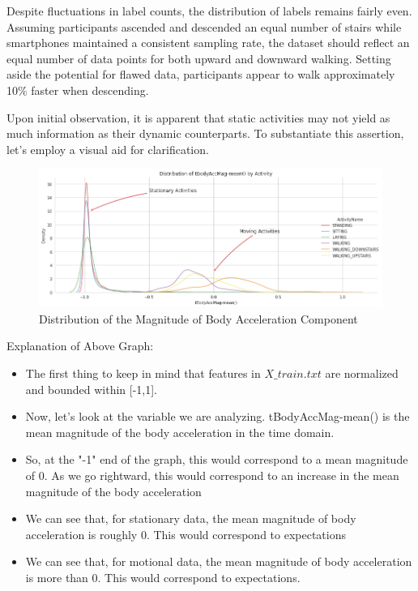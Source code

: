 \documentclass[conference]{IEEEtran}
\begin{document}
Despite fluctuations in label counts, the distribution of labels remains fairly even. Assuming participants ascended and descended an equal number of stairs while smartphones maintained a consistent sampling rate, the dataset should reflect an equal number of data points for both upward and downward walking. Setting aside the potential for flawed data, participants appear to walk approximately 10\% faster when descending. \newline 


Upon initial observation, it is apparent that static activities may not yield as much information as their dynamic counterparts. To substantiate this assertion, let's employ a visual aid for clarification. \newline 

\begin{figure}[h!]
	\includegraphics[width= 1.0 \linewidth]{distribution_acc_activity.png}
	\centering
	\caption{Distribution of the Magnitude of Body Acceleration Component}
	\label{distribution_acc_activity.png}
\end{figure}

Explanation of Above Graph: \newline 
\begin{itemize}
    \item The first thing to keep in mind that features in $X\_train.txt$ are normalized and bounded within [-1,1].
    \item Now, let's look at the variable we are analyzing. tBodyAccMag-mean() is the mean magnitude of the body acceleration in the time domain. 
    \item So, at the "-1" end of the graph, this would correspond to a mean magnitude of 0. As we go rightward, this would correspond to an increase in the  mean magnitude of the body acceleration
    \item We can see that, for stationary data, the mean magnitude of body acceleration is roughly 0. This would correspond to expectations
    \item We can see that, for motional data, the mean magnitude of body acceleration is more than 0. This would correspond to expectations. 
\end{itemize}
\end{document}
